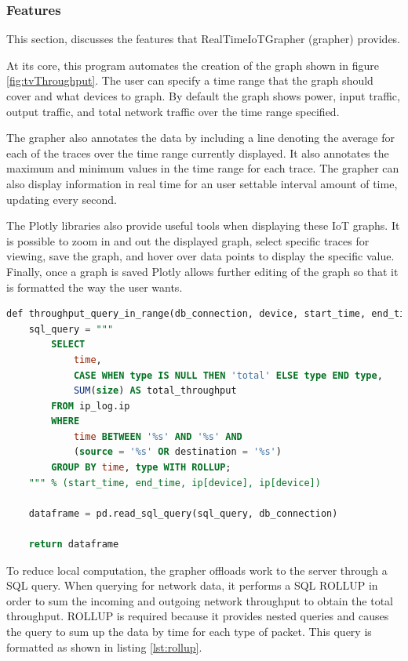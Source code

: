 \subsubsection{Features}
\label{Features}

This section, discusses the features that RealTimeIoTGrapher (grapher) provides.

At its core, this program automates the creation of the graph shown in figure \ref{fig:tvThroughput}. The user can specify a time range that the graph should cover and what devices to graph. By default the graph shows power, input traffic, output traffic, and total network traffic over the time range specified.

The grapher also annotates the data by including a line denoting the average for each of the traces over the time range currently displayed. It also annotates the maximum and minimum values in the time range for each trace. The grapher can also display information in real time for an user settable interval amount of time, updating every second.

The Plotly libraries also provide useful tools when displaying these IoT graphs. It is possible to zoom in and out the displayed graph, select specific traces for viewing, save the graph, and hover over data points to display the specific value. Finally, once a graph is saved Plotly allows further editing of the graph so that it is formatted the way the user wants.

\begin{minipage}{\textwidth}
    \begin{lstlisting}[language=SQL, label={lst:rollup},caption={Efficient SQL query to obtain total Network throughput at each second.}]
    def throughput_query_in_range(db_connection, device, start_time, end_time):
    sql_query = """
        SELECT
            time,
            CASE WHEN type IS NULL THEN 'total' ELSE type END type,
            SUM(size) AS total_throughput
        FROM ip_log.ip
        WHERE
            time BETWEEN '%s' AND '%s' AND
            (source = '%s' OR destination = '%s')
        GROUP BY time, type WITH ROLLUP;
    """ % (start_time, end_time, ip[device], ip[device])

    dataframe = pd.read_sql_query(sql_query, db_connection)

    return dataframe
    \end{lstlisting}
\end{minipage}

To reduce local computation, the grapher offloads work to the server through a SQL query. When querying for network data, it performs a SQL ROLLUP in order to sum the incoming and outgoing network throughput to obtain the total throughput. ROLLUP is required because it provides nested queries and causes the query to sum up the data by time for each type of packet. This query is formatted as shown in listing \ref{lst:rollup}.

